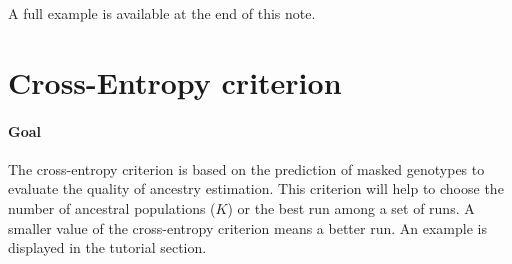 \documentclass[10pt,a4paper]{article}
\begin{document}
\noindent
A full example is available at the end of this note.

\section{Cross-Entropy criterion}

\paragraph{Goal}
The cross-entropy criterion is based on the prediction of masked genotypes to evaluate
the quality of ancestry estimation. This criterion will help to choose the 
number of ancestral populations ($K$) or the best run among a set of runs. A smaller value
of the cross-entropy criterion means a better run. An example is displayed in the tutorial section.
\end{document}
